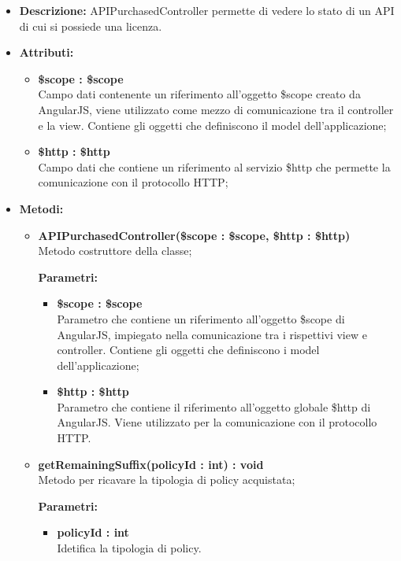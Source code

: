 \begin{itemize}
	\item \textbf{Descrizione:} APIPurchasedController permette di vedere lo stato di un API di cui si possiede una licenza.
	\item \textbf{Attributi:}
	\begin{itemize}
		
		\item \textbf{\$scope : \$scope}\\
		Campo dati contenente un riferimento all'oggetto \$scope creato da AngularJS, viene utilizzato come mezzo di comunicazione tra il controller e la view. Contiene gli oggetti che definiscono il model dell'applicazione;
		
		\item \textbf{\$http : \$http }\\
		Campo dati che contiene un riferimento al servizio \$http che permette la comunicazione con il protocollo HTTP;				
		
	\end{itemize}
	\item \textbf{Metodi:}
	\begin{itemize}
		
		\item \textbf{APIPurchasedController(\$scope : \$scope, \$http : \$http)}\\
		Metodo costruttore della classe;
		\begin{description}
			\item[\textbf{Parametri:}]
		\end{description}
		\begin{itemize}
			\item \textbf{\$scope : \$scope}\\
			Parametro che contiene un riferimento all'oggetto \$scope di AngularJS, impiegato nella comunicazione tra i rispettivi view e controller. Contiene gli oggetti che definiscono i model dell'applicazione;
			
			\item \textbf{\$http : \$http}\\
			Parametro che contiene il riferimento all'oggetto globale \$http di AngularJS. Viene utilizzato per la comunicazione con il protocollo HTTP.
			
		\end{itemize}		
		
		\item \textbf{getRemainingSuffix(policyId : int) : void}\\
		Metodo per ricavare la tipologia di policy acquistata;
		\begin{description}
			\item[\textbf{Parametri:}]
		\end{description}
		\begin{itemize}
			\item \textbf{policyId : int}\\
			Idetifica la tipologia di policy.
		\end{itemize}		
		

\end{itemize}
\end{itemize}
